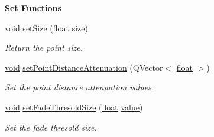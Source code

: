 \begin{Indent}{\bf Set Functions}\par
\begin{DoxyCompactItemize}
\item 
\hyperlink{group___u_a_v_objects_plugin_ga444cf2ff3f0ecbe028adce838d373f5c}{void} \hyperlink{class_g_l_c___point_sprite_aa805fdb1288a34094935631337b5071c}{set\-Size} (\hyperlink{_super_l_u_support_8h_a6a1bb6ed41f44b60e7bd83b0e9945aa7}{float} \hyperlink{glext_8h_a014d89bd76f74ef3a29c8f04b473eb76}{size})
\begin{DoxyCompactList}\small\item\em Return the point size. \end{DoxyCompactList}\item 
\hyperlink{group___u_a_v_objects_plugin_ga444cf2ff3f0ecbe028adce838d373f5c}{void} \hyperlink{class_g_l_c___point_sprite_a4da93aba8acc99ba8318e1802a1d6bbc}{set\-Point\-Distance\-Attenuation} (Q\-Vector$<$ \hyperlink{_super_l_u_support_8h_a6a1bb6ed41f44b60e7bd83b0e9945aa7}{float} $>$)
\begin{DoxyCompactList}\small\item\em Set the point distance attenuation values. \end{DoxyCompactList}\item 
\hyperlink{group___u_a_v_objects_plugin_ga444cf2ff3f0ecbe028adce838d373f5c}{void} \hyperlink{class_g_l_c___point_sprite_a62dfc5176d7e2a3b6a0d654e9a2cae37}{set\-Fade\-Thresold\-Size} (\hyperlink{_super_l_u_support_8h_a6a1bb6ed41f44b60e7bd83b0e9945aa7}{float} \hyperlink{glext_8h_aa0e2e9cea7f208d28acda0480144beb0}{value})
\begin{DoxyCompactList}\small\item\em Set the fade thresold size. \end{DoxyCompactList}\end{DoxyCompactItemize}
\end{Indent}
